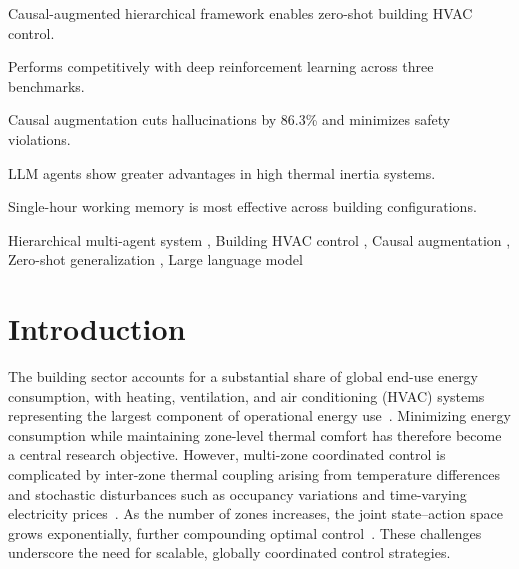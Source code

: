 \documentclass[a4paper]{cas-sc}
\begin{document}
\begin{highlights}
\item Causal-augmented hierarchical framework enables zero-shot building HVAC control.
\item Performs competitively with deep reinforcement learning across three benchmarks.
\item Causal augmentation cuts hallucinations by 86.3\% and minimizes safety violations.
\item LLM agents show greater advantages in high thermal inertia systems.
\item Single-hour working memory is most effective across building configurations.
\end{highlights}

\begin{keywords}
Hierarchical multi-agent system \sep
Building HVAC control \sep
Causal augmentation \sep
Zero-shot generalization \sep
Large language model
\end{keywords}

\maketitle

\section{Introduction}

The building sector accounts for a substantial share of global end-use energy consumption, with heating, ventilation, and air conditioning (HVAC) systems representing the largest component of operational energy use~\cite{IEA2025-ger,Chua2013-xc}. Minimizing energy consumption while maintaining zone-level thermal comfort has therefore become a central research objective. However, multi-zone coordinated control is complicated by inter-zone thermal coupling arising from temperature differences and stochastic disturbances such as occupancy variations and time-varying electricity prices~\cite{Yang2020-yu,Liu2024-fd}. As the number of zones increases, the joint state--action space grows exponentially, further compounding optimal control~\cite{Lei2022-ni}. These challenges underscore the need for scalable, globally coordinated control strategies.
\end{document}
